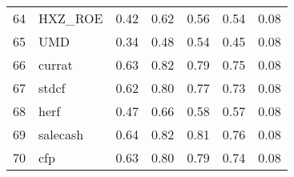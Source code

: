 \documentclass[12pt]{article}
\begin{document}
\begin{footnotesize}
\begin{longtable}{rl|c|c|c|c|c}
64  & HXZ\_ROE         & 0.42                                                                                      & 0.62                                                                                        & 0.56                                                                                         & 0.54 & 0.08               \\
65  & UMD              & 0.34                                                                                      & 0.48                                                                                        & 0.54                                                                                         & 0.45 & 0.08               \\
66  & currat           & 0.63                                                                                      & 0.82                                                                                        & 0.79                                                                                         & 0.75 & 0.08               \\
67  & stdcf            & 0.62                                                                                      & 0.80                                                                                        & 0.77                                                                                         & 0.73 & 0.08               \\
68  & herf             & 0.47                                                                                      & 0.66                                                                                        & 0.58                                                                                         & 0.57 & 0.08               \\
69  & salecash         & 0.64                                                                                      & 0.82                                                                                        & 0.81                                                                                         & 0.76 & 0.08               \\
70  & cfp              & 0.63                                                                                      & 0.80                                                                                        & 0.79                                                                                         & 0.74 & 0.08               \\

\end{longtable}
\end{footnotesize}
\end{document}
